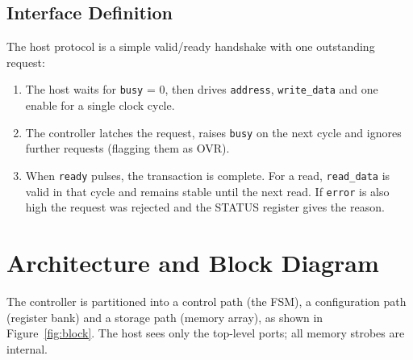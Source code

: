 \documentclass[11pt,a4paper]{article}
\newcommand{\sig}[1]{\texttt{#1}}
\begin{document}
\subsection{Interface Definition}
The host protocol is a simple valid/ready handshake with one outstanding request:
\begin{enumerate}[leftmargin=*,itemsep=2pt]
\item The host waits for \sig{busy} = 0, then drives \sig{address}, \sig{write\_data} and one enable for a single clock cycle.
\item The controller latches the request, raises \sig{busy} on the next cycle and ignores further requests (flagging them as OVR).
\item When \sig{ready} pulses, the transaction is complete. For a read, \sig{read\_data} is valid in that cycle and remains stable until the next read. If \sig{error} is also high the request was rejected and the STATUS register gives the reason.
\end{enumerate}

\section{Architecture and Block Diagram}
The controller is partitioned into a control path (the FSM), a configuration path (register bank) and a storage path (memory array), as shown in Figure~\ref{fig:block}. The host sees only the top-level ports; all memory strobes are internal.
\end{document}
